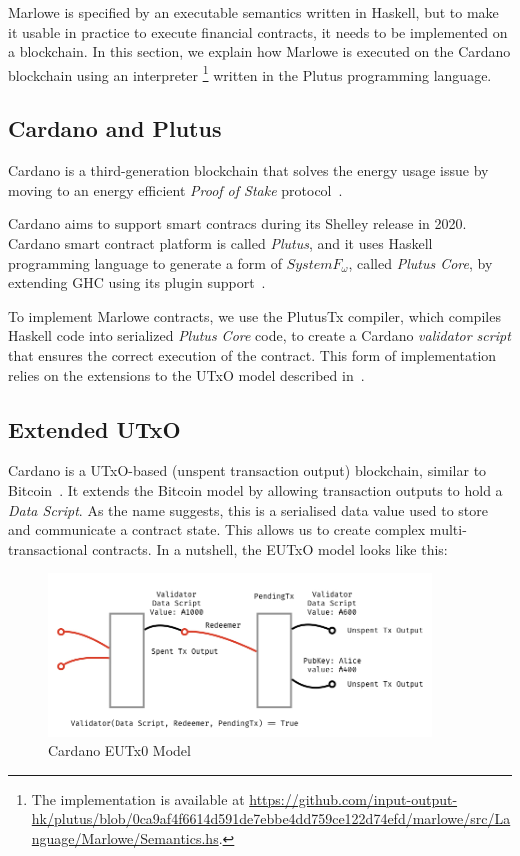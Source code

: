 \documentclass[runningheads]{llncs}
\begin{document}
Marlowe is specified by an executable semantics written in Haskell, but to make it usable in practice to execute financial contracts, it needs to be implemented on a blockchain. In this section, we explain how Marlowe is executed on the Cardano blockchain using an interpreter \footnote{The implementation is available at \url{https://github.com/input-output-hk/plutus/blob/0ca9af4f6614d591de7ebbe4dd759ce122d74efd/marlowe/src/Language/Marlowe/Semantics.hs}.} written in the Plutus programming language.

\subsection{Cardano and Plutus}

Cardano is a third-generation blockchain that solves the energy usage
issue by moving to an energy efficient \emph{Proof of Stake} protocol~\cite{Ouroboros-Genesis}.

Cardano aims to support smart contracs during its Shelley release in 2020.
Cardano smart contract platform is called \emph{Plutus}, and
it uses Haskell programming language to generate a form of $System F_{\omega}$,
called \emph{Plutus Core}, by extending GHC using its plugin
support~\cite[Section 13.3]{ghcusersguide}.

To implement Marlowe contracts, we use the PlutusTx compiler,
which compiles Haskell code into serialized \emph{Plutus Core} code,
to create a Cardano \emph{validator script} that ensures the correct execution of the contract.
This form of implementation relies on the extensions to the UTxO model described in~\cite{PlutusPlatform}.


\subsection{Extended UTxO}

Cardano is a UTxO-based (unspent transaction output) blockchain, similar to Bitcoin~\cite{sok}.
It extends the Bitcoin model by allowing transaction outputs to hold a \emph{Data Script}.
As the name suggests, this is  a serialised data value used to store and communicate a contract state.
This allows us to create complex multi-transactional contracts.
In a nutshell, the EUTxO model looks like this:

\begin{figure}[!h]
    \centering
    \includegraphics[width=4in]{figures/Marlowe3-Figures-003.jpeg}
    \caption{Cardano EUTx0 Model}
    \label{fig:eutxo}
\end{figure}
\end{document}

